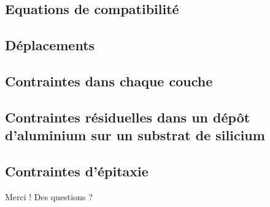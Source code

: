 \documentclass[10pt]{beamer}
\begin{document}
\subsection{Equations de compatibilité} 
\subsection{Déplacements} 
\subsection{Contraintes dans chaque couche} 





\subsection{Contraintes résiduelles dans un dépôt d'aluminium sur un substrat de silicium} 
\subsection{Contraintes d'épitaxie} 

\begin{frame}
    \Huge{\centerline{Merci ! Des questions ?}}
\end{frame}
    
\end{document}
